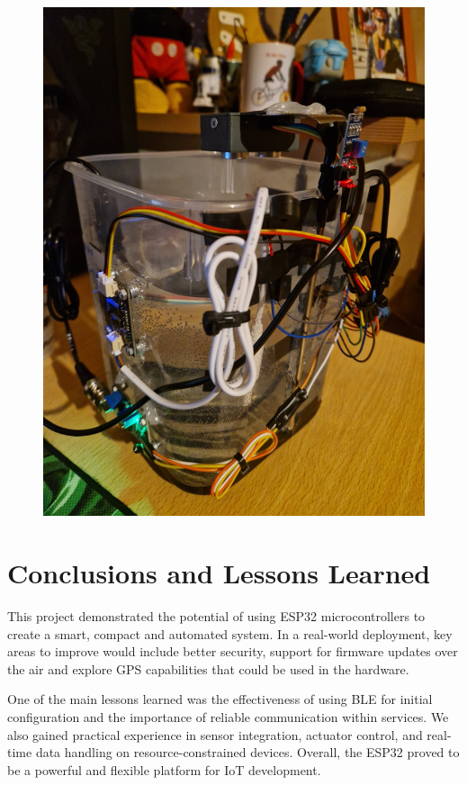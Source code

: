 \documentclass[11pt,a4paper]{article}
\begin{document}
\begin{figure}[h!]
\begin{minipage}{0.35\textwidth}
        \includegraphics[width=\linewidth]{Images/tras2Prot.jpeg}
    \end{minipage}
\end{figure}

\pagebreak

\section{Conclusions and Lessons Learned}

This project demonstrated the potential of using ESP32 microcontrollers to create a smart, compact and automated system. In a real-world deployment, key areas to improve would include better security, support for firmware updates over the air and explore GPS capabilities that could be used in the hardware.

One of the main lessons learned was the effectiveness of using BLE for initial configuration and the importance of reliable communication within services. We also gained practical experience in sensor integration, actuator control, and real-time data handling on resource-constrained devices. Overall, the ESP32 proved to be a powerful and flexible platform for IoT development.
\end{document}
